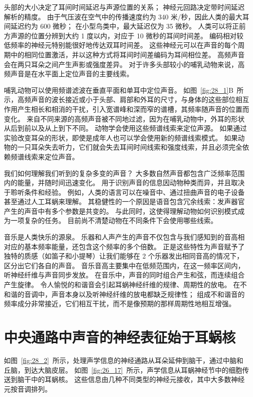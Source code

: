 头部的大小决定了耳间时间延迟与声源位置的关系； 神经元回路决定带时间延迟解析的精度。
由于气压波在空气中的传播速度约为 340 米/秒，因此人类的最大耳间延迟约为 600 微秒；
在小型鸟类中，最大延迟仅为 35 微秒。
人类可以将正前方声源的位置分辨到大约 1 度以内，对应于 10 微秒的耳间时间差。
编码相对较低频率的神经元特别能很好地传达双耳时间差。
这些神经元可以在声音的每个周期中的相同位置激活，并以这种方式将耳间时间差编码为耳间相位差。
高频声音会在两只耳朵之间产生声影或强度差异。
对于许多头部较小的哺乳动物来说，高频声音是在水平面上定位声音的主要线索。


哺乳动物可以使用频谱滤波在垂直平面和单耳中定位声音。
如图~\ref{fig:28_1}B~所示，高频声音的波长接近或小于头部、肩部和外耳的尺寸，与身体的这些部位相互作用产生相长和相消的干扰，引入宽谱峰和深而窄的谱槽，其频率随声音的位置而变化。
来自不同来源的高频声音被不同地过滤，因为在哺乳动物中，外耳的形状从后到前以及从上到下不同。
动物学会使用这些频谱线索来定位声源。
如果通过实验改变耳朵的形状，即使是成年人也可以学会使用新的频谱线索模式。
如果动物的一只耳朵失去听力，它们就会失去耳间时间线索和强度线索，并且必须完全依赖频谱线索来定位声音。


我们如何理解我们听到的复杂多变的声音？
大多数自然声音都包含广泛频率范围内的能量，并随时间迅速变化。
用于识别声音的信息因动物种类而异，并且取决于聆听条件和经验。
例如，人类的语言可以在噪音中、通过扭曲声音的电子设备甚至通过人工耳蜗来理解。
其稳健性的一个原因是语音包含冗余线索：发声器官产生的声音中有多个参数是共变的。
与此同时，这使得理解动物如何识别模式成为一项复杂的任务。
目前尚不清楚动物在不同条件下会使用哪些线索。


音乐是人类快乐的源泉。
乐器和人声产生的声音不仅包含与我们感知到的音高相对应的基本频率能量，还包含这个频率的多个倍数。
正是这些特性为声音赋予了独特的质感（如笛子和小提琴）让我们能够在 2 个乐器发出相同音高的情况下，区分出它们各自的声音。
音乐音高主要集中在低频范围内，在这一频率区间内，听神经纤维与声音同步发放。
在音乐中，声音的同时组合产生和弦，而连续组合产生旋律。
令人愉悦的和谐音会引起耳蜗神经纤维的规律、周期性的放电。
在不和谐的音调中，声音本身以及听神经纤维的放电都缺乏规律性；
组成不和谐音的频率成分非常接近，它们相互干扰，而不是像预期的那样周期性地相互增强。



\section{中央通路中声音的神经表征始于耳蜗核}

如图~\ref{fig:28_2}~所示，处理声学信息的神经通路从耳朵延伸到脑干，通过中脑和丘脑，到达大脑皮层。
如图~\ref{fig:26_17}~所示，声学信息从耳蜗神经节中的细胞传送到脑干中的耳蜗核。
这些信息由几种不同类型的神经元接收，其中大多数神经元按音调排列。



